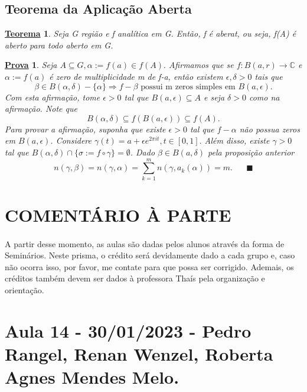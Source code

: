 \documentclass{article}
\newtheorem*{theorem*}{\underline{Teorema}}
\newtheorem*{proof*}{\underline{Prova}}
\renewcommand\qedsymbol{$\blacksquare$}
\begin{document}
\subsection{Teorema da Aplica\c c\~ao Aberta}
  \begin{theorem*}
    Seja G regi\~ao e f anal\'itica em G. Ent\~ao, f \'e aberat, ou seja, f(A) \'e aberto para todo aberto em G. 
  \end{theorem*}
 \begin{proof*}
   Seja $A\subseteq{G}, \alpha:=f(a)\in{f(A)}.$ Afirmamos que se $f:B(a, r)\rightarrow \mathbb{C}$ e $\alpha:=f(a)$ \'e zero de 
multiplicidade m de f-a, ent\~ao existem $\epsilon, \delta > 0$ tais que 
  $$
  \beta\in{B(\alpha, \delta)- \{\alpha\} }\Rightarrow f-\beta\text{ possui m zeros simples em }B(a, \epsilon).
  $$
  Com esta afirma\c c\~ao, tome $\epsilon > 0$ tal que $B(a, \epsilon)\subseteq{A}$ e seja $\delta > 0$ como na afirma\c c\~ao.
Note que
  $$
    B(\alpha, \delta)\subseteq{f(B(a, \epsilon))}\subseteq{f(A)}.
  $$
  Para provar a afirma\c c\~ao, suponha que existe $\epsilon > 0$ tal que $f - \alpha$ n\~ao possua zeros em $B(a, \epsilon)$. Considere
  $\gamma(t) = a + \epsilon e^{2\pi it}, t\in[0, 1].$ Al\'em disso, existe $\gamma > 0$ tal que $B(\alpha, \delta)\cap \{\sigma:=f\circ{\gamma}\}=\emptyset$.
  Dado $\beta\in{B(a, \delta)}$ pela proposi\c c\~ao anterior
  $$
  n(\gamma, \beta) = n(\gamma, \alpha) = \sum\limits_{k=1}^{m}n(\gamma, a_{k}(\alpha)) = m.\quad\text{ \qedsymbol}
  $$
 \end{proof*}
\newpage
\section{COMENT\'ARIO \`A PARTE}

\paragraph{}  A partir desse momento, as aulas s\~ao dadas pelos alunos atrav\'es da forma de Semin\'arios. Neste prisma, o cr\'edito ser\'a
devidamente dado a cada grupo e, caso n\~ao ocorra isso, por favor, me contate para que possa ser corrigido. Ademais, os cr\'editos
tamb\'em devem ser dados \`a professora Tha\'is pela organiza\c c\~ao e orienta\c c\~ao.

\section{Aula 14 - 30/01/2023 - Pedro Rangel, Renan Wenzel, Roberta Agnes Mendes Melo.}
\end{document}
